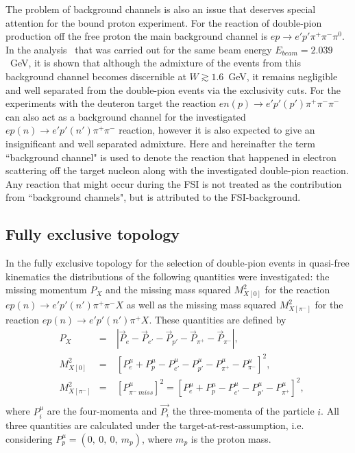 The problem of background channels is also an issue that deserves special attention for the bound proton experiment. For the reaction of double-pion production off the free proton the main background channel is $ep\rightarrow e'p'\pi^{+}\pi^{-}\pi^{0}$. In the analysis~\cite{Fed_an_note:2017} that was carried out for the same beam energy $E_{beam} = 2.039$~GeV, it is shown that although the admixture of the events from this background channel becomes discernible at $W\gtrsim 1.6$~GeV, it remains negligible and well separated from the double-pion events via the exclusivity cuts. For the experiments with the deuteron target the reaction $en(p) \rightarrow e'p'(p')\pi^{+}\pi^{-}\pi^{-}$ can also act as a background channel for the investigated $ep(n) \rightarrow e'p'(n')\pi^{+}\pi^{-}$ reaction, however it is also expected to give an insignificant and well separated admixture. Here and hereinafter the term ``background channel" is used to denote the reaction that happened in electron scattering off the target nucleon along with the investigated double-pion reaction. Any reaction that might occur during the FSI is not treated as the contribution from ``background channels", but is attributed to the FSI-background.



\subsection{Fully exclusive topology}
\label{Sect:excl_cut_fully_excl}


In the fully exclusive topology for the selection of double-pion events in quasi-free kinematics the distributions of the following quantities were investigated: the missing momentum $P_{X}$ and the missing mass squared $M^{2}_{X[0]}$ for the reaction $ep(n)\rightarrow e'p'(n')\pi^{+}\pi^{-}X$ as well as the missing mass squared $M^{2}_{X[\pi^{-}]}$ for the reaction $ep(n)\rightarrow e'p'(n')\pi^{+}X$. These quantities are defined by
\begin{equation}
\begin{aligned}
&P_{X}&=&~|\overrightarrow{P}_{e} - \overrightarrow{P}_{e'}- \overrightarrow{P}_{p'} - \overrightarrow{P}_{\pi^{+}} - \overrightarrow{P}_{\pi^{-}}|,\\[8pt]
&M_{X[0]}^{2}&=&~[P_{e}^{\mu} + P_{p}^{\mu}- P_{e'}^{\mu}- P_{p'}^{\mu}-  P_{\pi^{+}}^{\mu} - P_{\pi^{-}}^{\mu}]^{2},\\[8pt]
&M_{X[\pi^{-}]}^{2}&=&~[P_{\pi^{-}~miss}^{\mu}]^{2}=[P_{e}^{\mu} + P_{p}^{\mu}- P_{e'}^{\mu}- P_{p'}^{\mu}-  P_{\pi^{+}}^{\mu}]^{2},\\
\end{aligned}\label{eq:excl_top_quant}
\end{equation}%
where $P_{i}^{\mu}$ are the four-momenta and $\overrightarrow{P_{i}}$ the three-momenta of the particle $i$. All three quantities are calculated under the target-at-rest-assumption, i.e. considering $P^{\mu}_{p} = (0,~0,~0,~m_{p})$, where $m_{p}$ is the proton mass.


